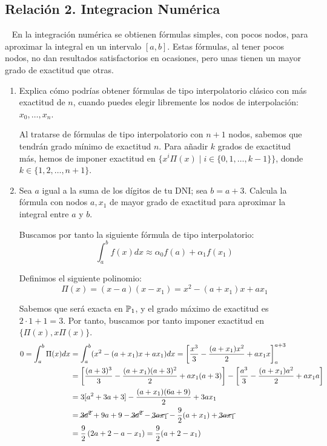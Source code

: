 \subsection{Relación 2. Integracion Numérica}
\setcounter{ejercicio}{0}


\begin{ejercicio}~\label{ej:2.3.1}
    En la integración numérica se obtienen fórmulas simples, con pocos nodos, para aproximar la integral en un intervalo $[a, b]$. Estas fórmulas, al tener pocos nodos, no dan resultados satisfactorios en ocasiones, pero unas tienen un mayor grado de exactitud que otras.
    \begin{enumerate}
        \item Explica cómo podrías obtener fórmulas de tipo interpolatorio clásico con más exactitud de $n$, cuando puedes elegir libremente los nodos de interpolación: $x_0, \ldots, x_n$.
        
        Al tratarse de fórmulas de tipo interpolatorio con $n+1$ nodos, sabemos que tendrán grado mínimo de exactitud $n$. Para añadir $k$ grados de exactitud más, hemos de imponer exactitud en $\{x^i\Pi(x)\mid i\in \{0,1,\ldots,k-1\}\}$, donde $k\in \{1,2,\ldots,n+1\}$.

        \item Sea $a$ igual a la suma de los dígitos de tu DNI; sea $b = a + 3$. Calcula la fórmula con nodos $a, x_1$ de mayor grado de exactitud para aproximar la integral entre $a$ y $b$.
        
        Buscamos por tanto la siguiente fórmula de tipo interpolatorio:
        \begin{equation*}
            \int_{a}^{b} f(x)dx \approx \alpha_0 f(a) + \alpha_1 f(x_1)
        \end{equation*}

        Definimos el siguiente polinomio:
        \begin{equation*}
            \Pi(x) = (x-a)(x-x_1) = x^2 - (a+x_1)x + ax_1
        \end{equation*}

        Sabemos que será exacta en $\mathbb{P}_1$, y el grado máximo de exactitud es $2\cdot 1+1=3$. Por tanto, buscamos por tanto imponer exactitud en $\{\Pi(x), x\Pi(x)\}$.
        \begin{align*}
            0 = \int_{a}^{b} \Pi(x)dx &= \int_{a}^{b} (x^2 - (a+x_1)x + ax_1)dx = \left[\dfrac{x^3}{3} - \dfrac{(a+x_1)x^2}{2} + ax_1x\right]_{a}^{a+3}\\
            &= \left[\dfrac{(a+3)^3}{3} - \dfrac{(a+x_1)(a+3)^2}{2} + ax_1(a+3)\right] - \left[\dfrac{a^3}{3} - \dfrac{(a+x_1)a^2}{2} + ax_1a\right]\\
            &= 3[a^2+3a+3] - \dfrac{(a+x_1)(6a+9)}{2} + 3ax_1\\
            &= \cancel{3a^2} + 9a + 9 - \cancel{3a^2}-\cancel{3ax_1} - \dfrac{9}{2}(a+x_1) + \cancel{3ax_1}\\
            &= \dfrac{9}{2}\left(2a+2-a-x_1\right) = \dfrac{9}{2}(a+2-x_1)
        \end{align*}


\end{enumerate}
\end{ejercicio}
